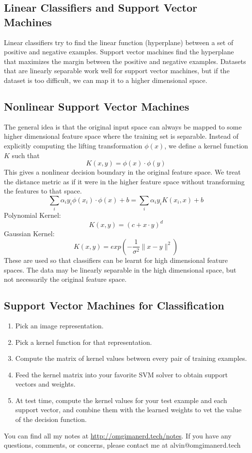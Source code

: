 \documentclass{math}
\begin{document}
\subsection*{Linear Classifiers and Support Vector Machines}
Linear classifiers try to find the linear function (hyperplane) between a set
of positive and negative examples. Support vector machines find the hyperplane
that maximizes the margin between the positive and negative examples. Datasets
that are linearly separable work well for support vector machines, but if the
dataset is too difficult, we can map it to a higher dimensional space.

\subsection*{Nonlinear Support Vector Machines}
The general idea is that the original input space can always be mapped to some
higher dimensional feature space where the training set is separable. Instead of
explicitly computing the lifting transformation \( \phi(x) \), we define a
kernel function \( K \) such that
\[ K(x,y) = \phi(x)\cdot\phi(y) \]
This gives a nonlinear decision boundary in the original feature space. We
treat the distance metric as if it were in the higher feature space without
transforming the features to that space.
\[ \sum_{i}\alpha_iy_i\phi(x_i)\cdot\phi(x)+b = \sum_{i}\alpha_iy_iK(x_i,x)+b \]
Polynomial Kernel:
\[ K(x,y) = (c+x\cdot y)^d \]
Gaussian Kernel:
\[ K(x,y) = exp\left(-\frac{1}{\sigma^2}\|x-y\|^2\right) \]
These are used so that classifiers can be learnt for high dimensional feature
spaces. The data may be linearly separable in the high dimensional space, but
not necessarily the original feature space.

\subsection*{Support Vector Machines for Classification}
\begin{enumerate}
  \item Pick an image representation.
  \item Pick a kernel function for that representation.
  \item Compute the matrix of kernel values between every pair of training
    examples.
  \item Feed the kernel matrix into your favorite SVM solver to obtain support
    vectors and weights.
  \item At test time, compute the kernel values for your test example and each
    support vector, and combine them with the learned weights to vet the value of the decision function.
\end{enumerate}

\begin{center}
  You can find all my notes at \url{http://omgimanerd.tech/notes}. If you have
  any questions, comments, or concerns, please contact me at
  alvin@omgimanerd.tech
\end{center}
\end{document}
